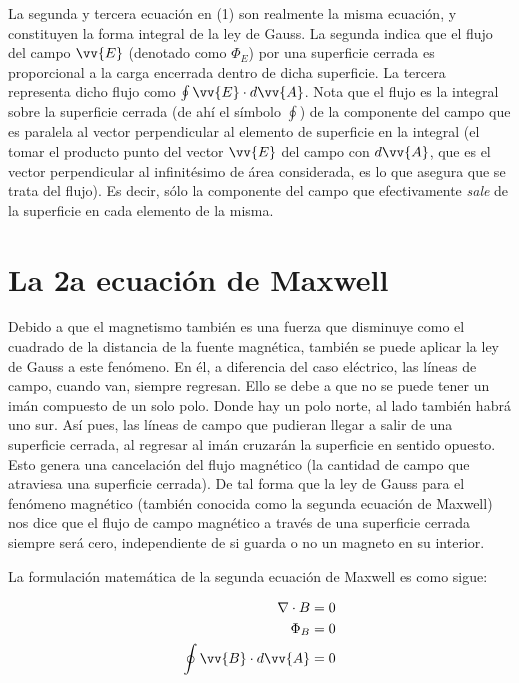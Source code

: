 \documentclass{article}
\begin{document}
La segunda y tercera ecuación en (1) son realmente la misma ecuación, y constituyen la forma integral de la ley de Gauss. La segunda indica que el flujo del campo $\vv{E}$ (denotado como $\Phi_E$) por una superficie cerrada es proporcional a la carga encerrada dentro de dicha superficie. La tercera representa dicho flujo como $\oint\vv{E}\cdot{d}\vv{A}$. Nota que el flujo es la integral sobre la superficie cerrada (de ahí el símbolo $\oint$) de la componente del campo que es paralela al vector perpendicular al elemento de superficie en la integral (el tomar el producto punto del vector $\vv{E}$ del campo con $d\vv{A}$, que es el vector perpendicular al infinitésimo de área considerada, es lo que asegura que se trata del flujo). Es decir, sólo la componente del campo que efectivamente \emph{sale} de la superficie en cada elemento de la misma.\bigskip

\section{La 2a ecuación de Maxwell}

Debido a que el magnetismo también es una fuerza que disminuye como el cuadrado de la distancia de la fuente magnética, también se puede aplicar la ley de Gauss a este fenómeno. En él, a diferencia del caso eléctrico, las líneas de campo, cuando van, siempre regresan. Ello se debe a que no se puede tener un imán compuesto de un solo polo. Donde hay un polo norte, al lado también habrá uno sur. Así pues, las líneas de campo que pudieran llegar a salir de una superficie cerrada, al regresar al imán cruzarán la superficie en sentido opuesto. Esto genera una cancelación del flujo magnético (la cantidad de campo que atraviesa una superficie cerrada). De tal forma que la ley de Gauss para el fenómeno magnético (también conocida como la segunda ecuación de Maxwell) nos dice que el flujo de campo magnético a través de una superficie cerrada siempre será cero, independiente de si guarda o no un magneto en su interior.\bigskip

La formulación matemática de la segunda ecuación de Maxwell es como sigue:\bigskip

\begin{equation}
\begin{aligned}
\nabla\cdot{B}=0\\
\Phi_B=0\\
\oint\vv{B}\cdot{d}\vv{A}=0
\end{aligned}
\end{equation}\bigskip
\end{document}
